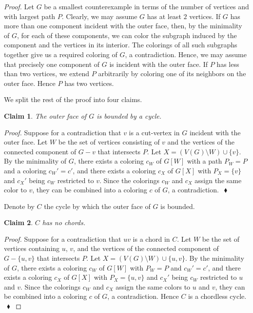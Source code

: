 \documentclass[a4paper,12pt]{article}
\newtheorem{claim}{Claim}
\newenvironment{proofclaim}[1][]%
    {\noindent \emph{Proof.} {}{#1}{}}{$~$\hfill $~\blacklozenge$ \vspace{0.2cm}}
\begin{document}
\begin{proof}
	Let $G$ be a smallest counterexample in terms of the number of vertices and with largest path $P$.
	Clearly, we may assume $G$ has at least $2$ vertices.
	If $G$ has more than one component incident with the outer face, 
	then, by the minimality of $G$, for each of these components, we can color the subgraph induced by the component 
	and the vertices in its interior.	
	The colorings of all such subgraphs together give us a required coloring of $G$, a contradiction.
	Hence, we may assume that precisely one component of $G$ is incident with the outer face.
	If $P$ has less than two vertices, we extend $P$ arbitrarily by coloring one of its neighbors on the outer face.
	Hence $P$ has two vertices.

	We split the rest of the proof into four claims.
\begin{claim}
	The outer face of $G$ is bounded by a cycle.
\end{claim}

\begin{proofclaim}
	Suppose for a contradiction that $v$ is a cut-vertex in $G$ incident with the outer face.
	Let $W$ be the set of vertices consisting of $v$ and the vertices of the connected component of $G-v$ that intersects $P$.
	Let $X = (V(G) \setminus W) \cup \{v\}$.
	By the minimality of $G$, there exists a coloring $c_W$ of $G[W]$ with a path $P_W = P$ and a coloring $c_W'=c'$,
	and there exists a coloring $c_X$ of $G[X]$ with $P_X=\{v\}$ and $c_X'$ being $c_W$ restricted to $v$.
	Since the colorings $c_W$ and $c_X$ assign the same color to $v$, they can be combined into a coloring $c$ of $G$, a contradiction.
\end{proofclaim}

Denote by $C$ the cycle by which the outer face of $G$ is bounded.

\begin{claim}
	\label{cl:chord}
	$C$ has no chords.
\end{claim}

\begin{proofclaim}
	Suppose for a contradiction that $uv$ is a chord in $C$.
	Let $W$ be the set of vertices containing $u$, $v$, and the vertices of the connected component of $G - \{u,v\}$ that intersects $P$.
	Let $X = (V(G) \setminus W) \cup \{u,v\}$.
	By the minimality of $G$, there exists a coloring $c_W$ of $G[W]$ with $P_W = P$ and $c_W'=c'$, and
	there exists a coloring $c_X$ of $G[X]$ with $P_X=\{u,v\}$ and $c_X'$ being $c_W$ restricted to $u$ and $v$.
	Since the colorings $c_W$ and $c_X$ assign the same colors to $u$ and $v$,
	they can be combined into a coloring $c$ of $G$, a contradiction.
	Hence $C$ is a chordless cycle.
\end{proofclaim}


\end{proof}
\end{document}

